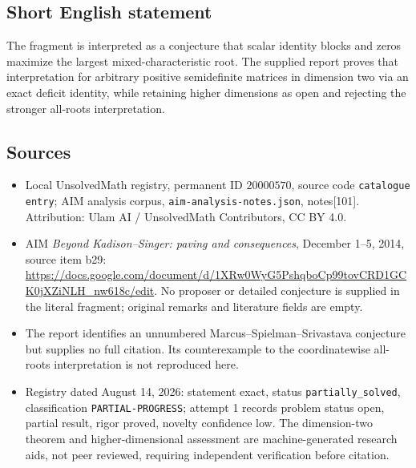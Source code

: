 \documentclass[11pt]{article}
\begin{document}
\subsection{Short English statement}
The fragment is interpreted as a conjecture that scalar identity blocks and zeros maximize the largest mixed-characteristic root. The supplied report proves that interpretation for arbitrary positive semidefinite matrices in dimension two via an exact deficit identity, while retaining higher dimensions as open and rejecting the stronger all-roots interpretation.
\subsection{Sources}
\begin{itemize}
\item Local UnsolvedMath registry, permanent ID \(20000570\), source code \texttt{catalogue entry}; AIM analysis corpus, \texttt{aim-analysis-notes.json}, notes[101]. Attribution: Ulam AI / UnsolvedMath Contributors, CC BY 4.0.
\item AIM \emph{Beyond Kadison--Singer: paving and consequences}, December 1--5, 2014, source item b29: \url{https://docs.google.com/document/d/1XRw0WyG5PshqboCp99tovCRD1GCK0jXZiNLH_nw618c/edit}. No proposer or detailed conjecture is supplied in the literal fragment; original remarks and literature fields are empty.
\item The report identifies an unnumbered Marcus--Spielman--Srivastava conjecture but supplies no full citation. Its counterexample to the coordinatewise all-roots interpretation is not reproduced here.
\item Registry dated August 14, 2026: statement exact, status \texttt{partially\_solved}, classification \texttt{PARTIAL-PROGRESS}; attempt 1 records problem status open, partial result, rigor proved, novelty confidence low. The dimension-two theorem and higher-dimensional assessment are machine-generated research aids, not peer reviewed, requiring independent verification before citation.
\end{itemize}
\end{document}
